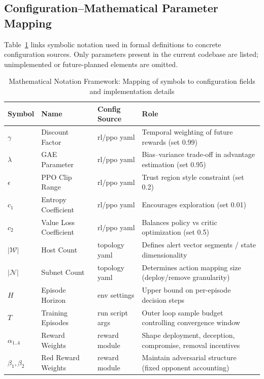 \documentclass[12pt,oneside]{article}
\begin{document}
\subsection{Configuration--Mathematical Parameter Mapping}

Table~\ref{tab:config_mapping} links symbolic notation used in formal definitions to concrete configuration sources. Only parameters present in the current codebase are listed; unimplemented or future-planned elements are omitted.

\begin{table}[H]
\centering
\caption{Mathematical Notation Framework: Mapping of symbols to configuration fields and implementation details}
\label{tab:config_mapping}
\begin{tabular}{lllp{5.5cm}}
\rowcolor{cwBorder!30} \textbf{Symbol} & \textbf{Name} & \textbf{Config Source} & \textbf{Role} \\
\midrule
$\gamma$ & Discount Factor & rl/ppo yaml & Temporal weighting of future rewards (set 0.99) \\
$\lambda$ & GAE Parameter & rl/ppo yaml & Bias--variance trade-off in advantage estimation (set 0.95) \\
$\epsilon$ & PPO Clip Range & rl/ppo yaml & Trust region style constraint (set 0.2) \\
$c_1$ & Entropy Coefficient & rl/ppo yaml & Encourages exploration (set 0.01) \\
$c_2$ & Value Loss Coefficient & rl/ppo yaml & Balances policy vs critic optimization (set 0.5) \\
$|\mathcal{W}|$ & Host Count & topology yaml & Defines alert vector segments / state dimensionality \\
$|\mathcal{N}|$ & Subnet Count & topology yaml & Determines action mapping size (deploy/remove granularity) \\
$H$ & Episode Horizon & env settings & Upper bound on per-episode decision steps \\
$T$ & Training Episodes & run script args & Outer loop sample budget controlling convergence window \\
$\alpha_{1..4}$ & Reward Weights & reward module & Shape deployment, deception, compromise, removal incentives \\
$\beta_{1},\beta_{2}$ & Red Reward Weights & reward module & Maintain adversarial structure (fixed opponent accounting) \\
\bottomrule
\end{tabular}
\end{table}
\end{document}

